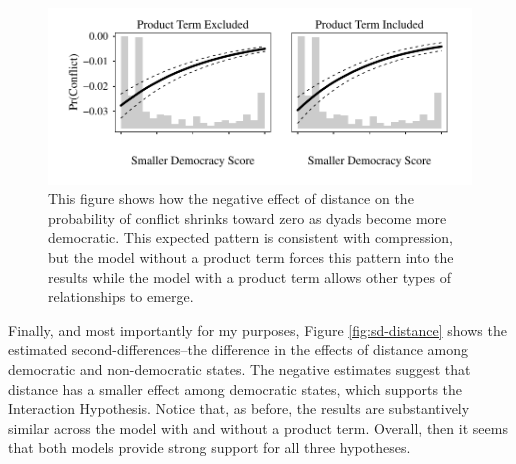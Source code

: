 \documentclass[12pt]{article}
\begin{document}
                \begin{figure}[H]
        \begin{center}
        \includegraphics[scale = .8]{fig/fig-fd-democracy.pdf}
        \end{center}\caption{This figure shows how the negative effect of distance on the probability of conflict shrinks toward zero as dyads become more democratic. This expected pattern is consistent with compression, but the model without a product term forces this pattern into the results while the model with a product term allows other types of relationships to emerge.}\label{fig:fd-democracy}
        \end{figure}

Finally, and most importantly for my purposes, Figure \ref{fig:sd-distance} shows the estimated second-differences--the difference in the effects of distance among democratic and non-democratic states. The negative estimates suggest that distance has a smaller effect among democratic states, which supports the Interaction Hypothesis. Notice that, as before, the results are substantively similar across the model with and without a product term. Overall, then it seems that both models provide strong support for all three hypotheses. 
\end{document}
